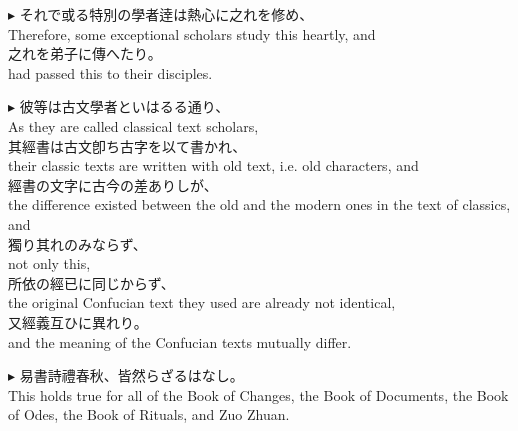 \documentclass{ctexart}
\makeatletter
\newcommand*{\shifttext}[1]{%
  \settowidth{\@tempdima}{#1}%
  \hspace{-\@tempdima}#1%
}
\newcommand{\plabel}[1]{%
\shifttext{\textbf{#1}\quad}%
}
\newcommand{\prule}{%
\begin{center}%
\hdashrule[0.5ex]{.99\linewidth}{1pt}{1pt 2.5pt}%
\end{center}%
}
\makeatother
\begin{document}
\vspace{1em}
\plabel{$\blacktriangleright$}%
それで或る特別の學者逹は熱心に之れを修め、\\
Therefore, some exceptional scholars study this heartly, and\\
之れを弟子に傳へたり。\\
had passed this to their disciples.

\prule

\plabel{$\blacktriangleright$}%
彼等は古文學者といはるる通り、\\
As they are called classical text scholars,\\
其經書は古文卽ち古字を以て書かれ、\\
their classic texts are written with old text, i.e. old characters, and\\
經書の文字に古今の差ありしが、\\
the difference existed between the old and the modern ones in the text of classics, and\\
獨り其れのみならず、\\
not only this,\\
所依の經已に同じからず、\\
the original Confucian text they used are already not identical,\\
又經義互ひに異れり。\\
and the meaning of the Confucian texts mutually differ.

\vspace{1em}
\plabel{$\blacktriangleright$}%
易\textperiodcentered 書\textperiodcentered 詩\textperiodcentered 禮\textperiodcentered 春秋、皆然らざるはなし。\\
This holds true for all of the Book of Changes, the Book of Documents, the Book of Odes, the Book of Rituals, and Zuo Zhuan.
\end{document}
